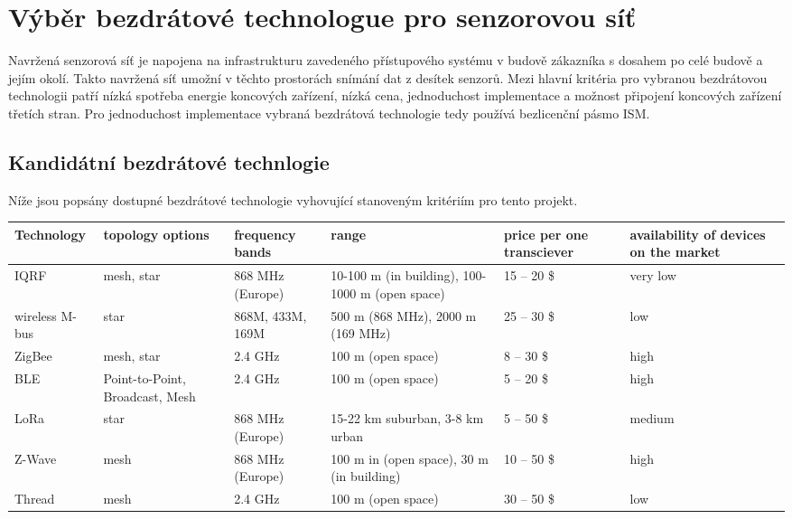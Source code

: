   \chapter{Výběr bezdrátové technologue pro senzorovou síť}
Navržená senzorová síť je napojena na infrastrukturu zavedeného přístupového systému v budově zákazníka s dosahem po celé budově a jejím okolí. Takto navržená síť umožní v těchto prostorách snímání dat z desítek senzorů.
Mezi hlavní kritéria pro vybranou bezdrátovou technologii patří nízká spotřeba energie koncových zařízení, nízká cena, jednoduchost implementace a možnost připojení koncových zařízení třetích stran.
Pro jednoduchost implementace vybraná bezdrátová technologie tedy používá bezlicenční pásmo ISM. 

\section{Kandidátní bezdrátové technlogie}
Níže jsou popsány dostupné bezdrátové technologie vyhovující stanoveným kritériím pro tento projekt.

\begin{table}[]
  \begin{tabular}{|p{1.5cm}||p{2cm}|p{2cm}|p{2cm}|p{2cm}|p{2cm}|}
  \hline
  Technology    & topology options                & frequency bands  & range                                           & price per one transciever & availability of devices on the market \\ \hline \hline
  IQRF           & mesh, star                      & 868 MHz (Europe) & 10-100 m (in building), 100-1000 m (open space) & 15 – 20 \$                & very low                              \\ \hline
  wireless M-bus & star                            & 868M, 433M, 169M & 500 m (868 MHz), 2000 m (169 MHz)               & 25 – 30 \$                & low                                   \\ \hline
  ZigBee         & mesh, star                      & 2.4 GHz          & 100 m (open space)                              & 8 – 30 \$                 & high                                  \\ \hline
  BLE            & Point-to-Point, Broadcast, Mesh & 2.4 GHz          & 100 m (open space)                              & 5 – 20 \$                 & high                                  \\ \hline
  LoRa           & star                            & 868 MHz (Europe) & 15-22 km suburban, 3-8 km urban                 & 5 – 50 \$                 & medium                                \\ \hline
  Z-Wave         & mesh                            & 868 MHz (Europe) & 100 m in (open space), 30 m (in building)       & 10 – 50 \$                & high                                  \\ \hline
  Thread         & mesh                            & 2.4 GHz          & 100 m (open space)                              & 30 – 50 \$                & low                                   \\ \hline
  \end{tabular}
\end{table}

